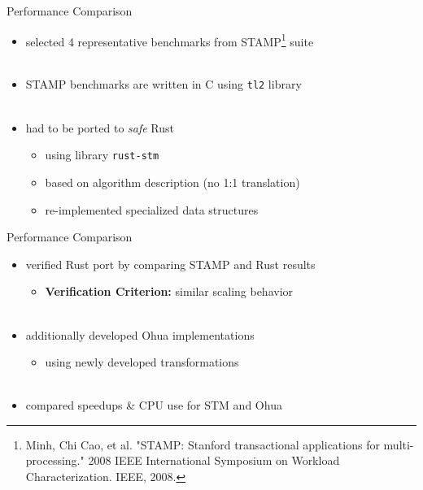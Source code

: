 \documentclass[aspectratio=169, usenames, dvipsnames]{beamer}
\begin{document}
\begin{frame}{Performance Comparison}
    \begin{itemize}
        \item selected 4 representative benchmarks from STAMP\footnote[3]{Minh, Chi Cao, et al. "STAMP: Stanford transactional applications for multi-processing." 2008 IEEE International Symposium on Workload Characterization. IEEE, 2008.} suite\\ \
        \item<2-> STAMP benchmarks are written in C using \texttt{tl2} library\\ \
        \item<3-> had to be ported to \emph{safe} Rust
            \begin{itemize}
                \item<3-> using library \texttt{rust-stm}
                \item<4-> based on algorithm description (no 1:1 translation)
                \item<5-> re-implemented specialized data structures
            \end{itemize}
    \end{itemize}
\end{frame}

\begin{frame}{Performance Comparison}
    \begin{itemize}
        \item verified Rust port by comparing STAMP and Rust results
            \begin{itemize}
                \item<2-> \textbf{Verification Criterion:} similar scaling behavior\\ \
            \end{itemize}
        \item<3-> additionally developed Ohua implementations
            \begin{itemize}
                \item<3-> using newly developed transformations\\ \
            \end{itemize}
        \item<4-> compared speedups \& CPU use for STM and Ohua
    \end{itemize}
\end{frame}
\end{document}
